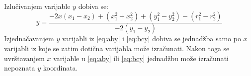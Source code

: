 Izlučivanjem varijable $y$ dobiva se:
\begin{equation}
\label{eq:bcy}
    y = \frac{-2x(x_1 - x_2) + (x_1^2+x_2^2) + (y_1^2 - y_2^2) - (r_1^2 - r_2^2)}{-2(y_1 - y_2)}
\end{equation}
Izjednačavanjem $y$ varijabli iz \eqref{eq:aby} i \eqref{eq:bcy} dobiva se jednadžba samo po $x$ varijabli iz koje se zatim dotična varijabla može izračunati. 
Nakon toga se uvrštavanjem $x$ varijable u \eqref{eq:aby} ili \eqref{eq:bcy} jednadžbu može izračunati nepoznata $y$ koordinata.





